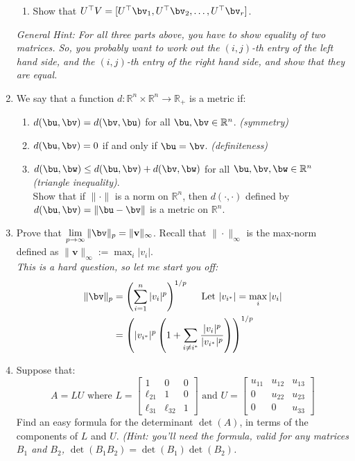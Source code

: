 \documentclass[10pt]{article}
\begin{document}
\begin{enumerate}
\begin{enumerate}
\item Show that $U^{\top}V = [U^{\top}\bv_1, U^{\top}\bv_2,\ldots, U^{\top}\bv_{r}]$. \\
\end{enumerate}

{\em General Hint: For all three parts above, you have to show equality of two matrices. So, you probably want to work out the $(i,j)$-th entry of the left hand side, and the $(i,j)$-th entry of the right hand side, and show that they are equal.}   

\item We say that a function $d: \mathbb{R}^{n}\times \mathbb{R}^{n} \to \mathbb{R}_{+}$ is a metric if:
\begin{enumerate}
	\item $d(\bu,\bv) = d(\bv,\bu)$ for all $\bu,\bv\in\mathbb{R}^{n}$. {\em (symmetry)}\\
	\item $d(\bu,\bv) = 0$ if and only if $\bu = \bv$. {\em (definiteness)} \\
	\item $d(\bu,\bw) \leq d(\bu,\bv) + d(\bv,\bw)$ for all $\bu,\bv,\bw\in\mathbb{R}^{n}$ {\em (triangle inequality)}. \\
	
	Show that if $\|\cdot\|$ is a norm on $\mathbb{R}^{n}$, then $d(\cdot,\cdot)$ defined by $d(\bu,\bv) = \|\bu - \bv\|$ is a metric on $\mathbb{R}^{n}$. 

\end{enumerate}

\item Prove that $\displaystyle \lim_{p\to\infty} \|\bv\|_{p} = \|\mathbf{v}\|_{\infty}$. Recall that $\|\cdot\|_{\infty}$ is the max-norm defined as $\|\mathbf{v}\|_{\infty} := \max_{i} |v_i|$. \\
{\em This is a hard question, so let me start you off:}
\begin{align*}
\|\bv\|_{p} & = \left(\sum_{i=1}^{n}|v_i|^{p}\right)^{1/p} \quad \text{ Let } |v_{i^{*}}| = \max_{i} |v_i| \\
	& = \left(|v_{i^{*}}|^{p}\left( 1 + \sum_{i\neq i^{*}}\frac{|v_i|^{p}}{|v_{i^{*}}|^{p}}\right)\right)^{1/p}
\end{align*}

\item Suppose that:
$$
A = LU \text{ where } L  = \left[\begin{matrix} 1 & 0 & 0 \\ \ell_{21} & 1 & 0 \\ \ell_{31} & \ell_{32} & 1 \end{matrix}\right] \text{ and } U = \left[\begin{matrix} u_{11} & u_{12} & u_{13} \\ 0 & u_{22} & u_{23} \\ 0 & 0 & u_{33} \end{matrix}\right]
$$
 Find an easy formula for the determinant $\det(A)$, in terms of the components of $L$ and $U$. {\em (Hint: you'll need the formula, valid for any matrices $B_1$ and $B_2$, $\det(B_1B_2) = \det(B_1)\det(B_2)$.}
 

\end{enumerate}
\end{document}
